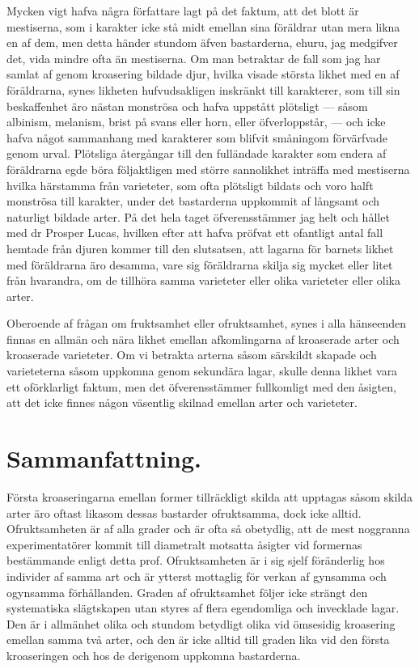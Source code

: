 Mycken vigt hafva några författare lagt på det faktum, att det blott är mestiserna, som i karakter icke stå midt emellan sina föräldrar utan mera likna en af dem, men detta händer stundom äfven bastarderna, ehuru, jag medgifver det, vida mindre ofta än mestiserna. Om man betraktar de fall som jag har samlat af genom kroasering bildade djur, hvilka visade största likhet med en af föräldrarna, synes likheten hufvudsakligen inskränkt till karakterer, som till sin beskaffenhet äro nästan monströsa och hafva uppstått plötsligt — såsom albinism, melanism, brist på svans eller horn, eller öfverloppstår, — och icke hafva något sammanhang med karakterer som blifvit småningom förvärfvade genom urval. Plötsliga återgångar till den fulländade karakter som endera af föräldrarna egde böra följaktligen med större sannolikhet inträffa med mestiserna hvilka härstamma från varieteter, som ofta plötsligt bildats och voro halft monströsa till karakter, under det bastarderna uppkommit af långsamt och naturligt bildade arter. På det hela taget öfverensstämmer jag helt och hållet med dr Prosper Lucas, hvilken efter att hafva pröfvat ett ofantligt antal fall hemtade från djuren kommer till den slutsatsen, att lagarna för barnets likhet med föräldrarna äro desamma, vare sig föräldrarna skilja sig mycket eller litet från hvarandra, om de tillhöra samma varieteter eller olika varieteter eller olika arter.

Oberoende af frågan om fruktsamhet eller ofruktsamhet, synes i alla hänseenden finnas en allmän och nära likhet emellan afkomlingarna af kroaserade arter och kroaserade varieteter. Om vi betrakta arterna såsom särskildt skapade och varieteterna såsom uppkomna genom sekundära lagar, skulle denna likhet vara ett oförklarligt faktum, men det öfverensstämmer fullkomligt med den åsigten, att det icke finnes någon väsentlig skilnad emellan arter och varieteter.



\section{Sammanfattning.}

Första kroaseringarna emellan former tillräckligt skilda att upptagas såsom skilda arter äro oftast likasom dessas bastarder ofruktsamma, dock icke alltid. Ofruktsamheten är af alla grader och är ofta så obetydlig, att de mest noggranna experimentatörer kommit till diametralt motsatta åsigter vid formernas bestämmande enligt detta prof. Ofruktsamheten är i sig sjelf föränderlig hos individer af samma art och är ytterst mottaglig för verkan af gynsamma och ogynsamma förhållanden. Graden af ofruktsamhet följer icke strängt den systematiska slägtskapen utan styres af flera egendomliga och invecklade lagar. Den är i allmänhet olika och stundom betydligt olika vid ömsesidig kroasering emellan samma två arter, och den är icke alltid till graden lika vid den första kroaseringen och hos de derigenom uppkomna bastarderna.

